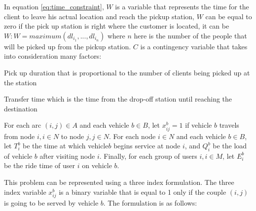 \documentclass{article}
\begin{document}
In equation \ref{eq:time_constraint}, $W$ is a variable that represents the time for the client to leave his actual location and reach the pickup station, $W$ can be equal to zero if the pick up station is right where the 
customer is located, it can be $ W: W = maximum(dl_{i_{1}},...,dl_{i_{n}})$ where $n$ here is the number of the people that will be picked up from the pickup station. $C$ is a contingency variable that takes into consideration many factors: \\
\begin{list}{}
\item Pick up duration that is proportional to the number of clients being picked up at the station
\item Transfer time which is the time from the drop-off station until reaching the destination
\end{list} 

For each arc $(i, j) \in A$ and each vehicle $b\in B$, let $x_{ij}^{b} = 1$ if vehicle $b$ travels from node $i, i \in N$ to node $j, j \in N$. For each node $ i \in N$ and each vehicle $b \in B$, let $T^{b}_{i} $ be the time at which vehicle$ b$
begins service at node $i$, and $Q^{b}_{i}$ be the load of vehicle $b$ after visiting node $i$. Finally, for each group of users $i, i \in M$, let $E^{b}_{i}$ be the ride time of user $i$ on vehicle $b$.

This problem can be represented using a three index formulation. The three index variable $x_{ij}^{b}$ is a binary variable that is equal to 1 only if the couple  $(i,j)$ is going to be served by vehicle $b$. The formulation is as follows:

\end{document}
